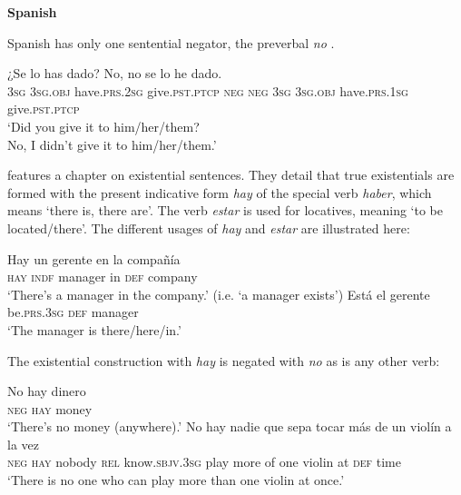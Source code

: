 \documentclass[output=paper]{langsci/langscibook}
\begin{document}
\begin{unindented}
\textbf{Spanish}

Spanish has only one sentential negator, the preverbal \textit{no}
\parencite[319ff]{ButtBenjamin1994}. 
%
\begin{exe}\ex \gll
¿Se lo has dado?\hspace{2.5in}
No, no se lo he dado.
\\
\textsc{3sg} \textsc{3sg.obj} have.\textsc{prs.2sg} give.\textsc{pst.ptcp}
\textsc{neg} \textsc{neg} \textsc{3sg} \textsc{3sg.obj} have.\textsc{prs.1sg} give.\textsc{pst.ptcp}
        \\
    \glt
‘Did you give it to him/her/them?\\
No, I didn’t give it to him/her/them.' \parencite[320]{ButtBenjamin1994}
    \end{exe}

\textcite[382ff]{ButtBenjamin1994} features a chapter on existential
sentences. They detail that true existentials are formed with the present
indicative form \textit{hay} of the special verb \textit{haber}, which
means `there is, there are'. The verb \textit{estar} is used for locatives,
meaning `to be located\slash there'. The different usages of \textit{hay} and \textit{estar} are illustrated here:
%
\begin{exe}\ex \gll Hay un gerente en la compañía \\
\textsc{hay} \textsc{indf} manager in \textsc{def} company \\
    \glt `There's a manager in the company.' (i.e. `a manager exists')
\parencite[383]{ButtBenjamin1994}
\ex \gll Está el gerente \\
be.\textsc{prs.3sg} \textsc{def} manager \\
    \glt `The manager is there/here/in.' \parencite[383]{ButtBenjamin1994}
    \end{exe}

The existential construction with \textit{hay} is negated with \textit{no} as is any other verb:
%
\begin{exe}\ex \gll No hay dinero \\
\textsc{neg} \textsc{hay} money \\
    \glt `There's no money (anywhere).' \parencite[383]{ButtBenjamin1994}
\ex \gll No hay nadie que  sepa tocar más  de un violín a  la vez \\
\textsc{neg} \textsc{hay} nobody \textsc{rel} know.\textsc{sbjv.3sg} play  more of  one violin at \textsc{def} time \\
    \glt `There is no one who can play more than one violin at once.'
\parencite[269]{ButtBenjamin1994}
    \end{exe}


\end{unindented}
\end{document}
